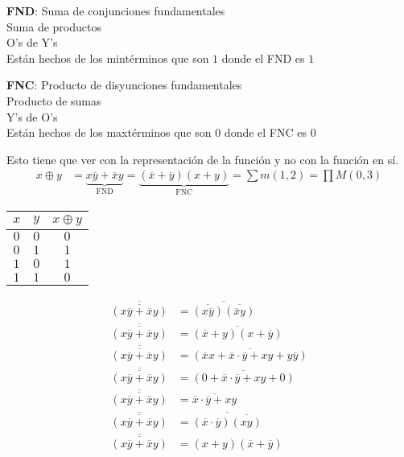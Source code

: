 \documentclass[12pt, twoside]{article}
\begin{document}
\maketitle
\thispagestyle{fancy}

\noindent \textbf{FND}: Suma de conjunciones fundamentales\\
Suma de productos\\
O's de Y's\\
Están hechos de los mintérminos que son $1$ donde el FND es $1$

\noindent \textbf{FNC}: Producto de disyunciones fundamentales\\
Producto de sumas\\
Y's de O's\\
Están hechos de los maxtérminos que son $0$ donde el FNC es $0$

Esto tiene que ver con la representación de la función y no con la función en sí.
\begin{align*}
	x\oplus y &= \underbrace{x\overline{y}+\overline{x}y}_{\text{FND}}
	=\underbrace{(\overline{x}+\overline{y})(x+y)}_{\text{FNC}}
	=\sum m(1,2)=\prod M(0,3)
\end{align*}
\begin{center}
	\begin{tabular}{cc|c}
		$x$ & $y$ & $x\oplus y$\\
		\hline
		$0$ & $0$ & $0$\\
		$0$ & $1$ & $1$\\
		$1$ & $0$ & $1$\\
		$1$ & $1$ & $0$
	\end{tabular}
\end{center}
\begin{align*}
	\overline{\overline{(x\overline{y}+\overline{x}y)}} &=
	\overline{\overline{(x\overline{y})}\overline{(\overline{x}y)}}\\
	\overline{\overline{(x\overline{y}+\overline{x}y)}} &=
	\overline{(\overline{x}+y)(x+\overline{y})}\\
	\overline{\overline{(x\overline{y}+\overline{x}y)}} &=
	\overline{(\overline{x}x+\overline{x}\cdot\overline{y}+xy+y\overline{y})}\\
	\overline{\overline{(x\overline{y}+\overline{x}y)}} &=
	\overline{(0+\overline{x}\cdot\overline{y}+xy+0)}\\
	\overline{\overline{(x\overline{y}+\overline{x}y)}} &=
	\overline{\overline{x}\cdot\overline{y}+xy}\\
	\overline{\overline{(x\overline{y}+\overline{x}y)}} &=
	\overline{(\overline{x}\cdot\overline{y})\overline{(xy)}}\\
	\overline{\overline{(x\overline{y}+\overline{x}y)}} &=
	\boxed
	{
		(x+y)(\overline{x}+\overline{y})
	}
\end{align*}
\end{document}
